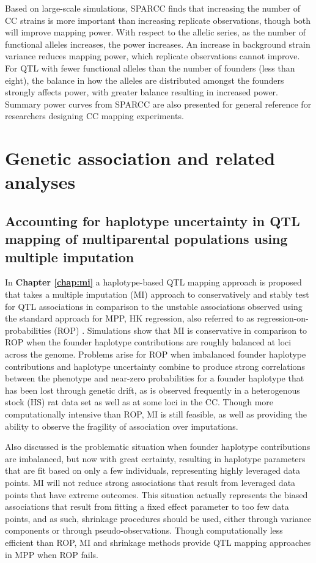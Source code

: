 Based on large-scale simulations, SPARCC finds that increasing the number of CC strains is more important than increasing replicate observations, though both will improve mapping power. With respect to the allelic series, as the number of functional alleles increases, the power increases. An increase in background strain variance reduces mapping power, which replicate observations cannot improve. For QTL with fewer functional alleles than the number of founders (less than eight), the balance in how the alleles are distributed amongst the founders strongly affects power, with greater balance resulting in increased power. Summary power curves from SPARCC are also presented for general reference for researchers designing CC mapping experiments.

\section{Genetic association and related analyses}

\subsection{Accounting for haplotype uncertainty in QTL mapping of multiparental populations using multiple imputation}

In \textbf{Chapter \ref{chap:mi}} a haplotype-based QTL mapping approach is proposed that takes a multiple imputation (MI) approach to conservatively and stably test for QTL associations in comparison to the unstable associations observed using the standard approach for MPP, HK regression, also referred to as regression-on-probabilities (ROP) \citep{Haley1992,Martinez1992}. Simulations show that MI is conservative in comparison to ROP when the founder haplotype contributions are roughly balanced at loci across the genome. Problems arise for ROP when imbalanced founder haplotype contributions and haplotype uncertainty combine to produce strong correlations between the phenotype and near-zero probabilities for a founder haplotype that has been lost through genetic drift, as is observed frequently in a heterogenous stock (HS) rat data set as well as at some loci in the CC. Though more computationally intensive than ROP, MI is still feasible, as well as providing the ability to observe the fragility of association over imputations.

Also discussed is the problematic situation when founder haplotype contributions are imbalanced, but now with great certainty, resulting in haplotype parameters that are fit based on only a few individuals, representing highly leveraged data points. MI will not reduce strong associations that result from leveraged data points that have extreme outcomes. This situation actually represents the biased associations that result from fitting a fixed effect parameter to too few data points, and as such, shrinkage procedures should be used, either through variance components \citep{Wei2016} or through pseudo-observations. Though computationally less efficient than ROP, MI and shrinkage methods provide QTL mapping approaches in MPP when ROP fails.

